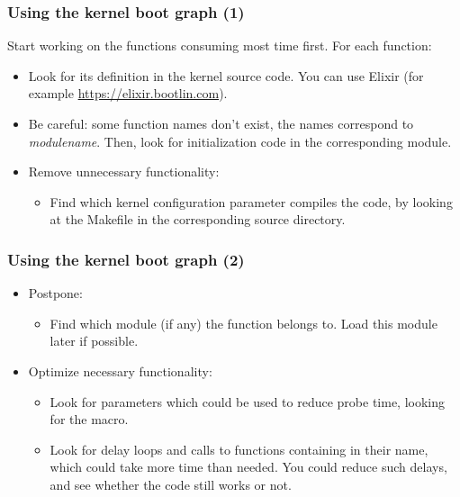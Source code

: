 \begin{frame}
\frametitle{Using the kernel boot graph (1)}
Start working on the functions consuming most time first. For each
function:
\begin{itemize}
\item Look for its definition in the kernel source code. You can use
      Elixir (for example \url{https://elixir.bootlin.com}).
\item Be careful: some function names don't exist, the names
      correspond to {\em modulename}. Then, look for
      initialization code in the corresponding module.
\item Remove unnecessary functionality:
      \begin{itemize}
      \item Find which kernel configuration parameter
      compiles the code, by looking at the Makefile in the corresponding
      source directory.
      \end{itemize}
\end{itemize}
\end{frame}

\begin{frame}
\frametitle{Using the kernel boot graph (2)}
\begin{itemize}
\item Postpone:
      \begin{itemize}
      \item Find which module (if any) the function belongs to.
            Load this module later if possible.
      \end{itemize}
\item Optimize necessary functionality:
      \begin{itemize}
      \item Look for parameters which could be used to reduce probe time,
            looking for the  macro.
      \item Look for delay loops and calls to functions containing
             in their name, which could take more time than
            needed. You could reduce such delays, and see whether the
            code still works or not.
      \end{itemize}
\end{itemize}
\end{frame}

